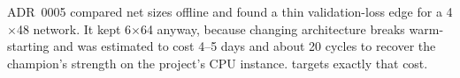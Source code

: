 ADR~0005 compared net sizes offline and found a thin validation-loss edge for a 4$\times$48
network. It kept 6$\times$64 anyway, because changing architecture breaks warm-starting and
was estimated to cost 4--5 days and about 20 cycles to recover the champion's strength on
the project's CPU instance.  targets exactly that cost.
